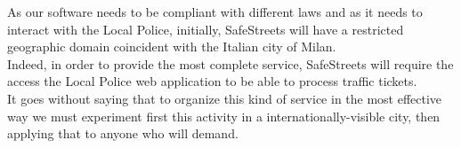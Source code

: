 As our software needs to be compliant with different laws and as it needs to interact with the Local Police, initially, SafeStreets will have a restricted geographic domain coincident with the Italian
city of Milan. \\
Indeed, in order to provide the most complete service, SafeStreets will require the access the Local Police web application to be able to process traffic tickets. \\
It goes without saying that to organize this kind of service in the most effective way we must experiment first this activity in a internationally-visible city, then applying that to anyone who will demand.